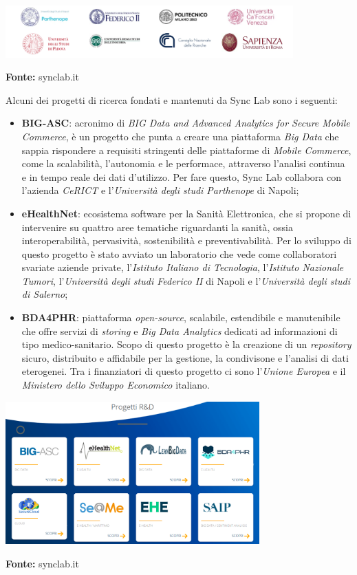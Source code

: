 \begin{minipage}{\linewidth}
  \centering
    \includegraphics[height=2cm]{immagini/universita}
  \caption*{\textbf{Fonte:} synclab.it}
\end{minipage}

Alcuni dei progetti di ricerca fondati e mantenuti da Sync Lab sono i seguenti:
\begin{itemize}
  \item \textbf{BIG-ASC}: acronimo di \textit{BIG Data and Advanced Analytics for Secure Mobile Commerce}, è un progetto che punta a creare una piattaforma \textit{Big Data} che sappia rispondere a requisiti stringenti delle piattaforme di \textit{Mobile Commerce}, come la scalabilità, l'autonomia e le performace, attraverso l'analisi continua e in tempo reale dei dati d'utilizzo. Per fare questo, Sync Lab collabora con l'azienda \textit{CeRICT} e l'\textit{Università degli studi Parthenope} di Napoli;
  \item \textbf{eHealthNet}: ecosistema software per la Sanità Elettronica, che si propone di intervenire su quattro aree tematiche riguardanti la sanità, ossia interoperabilità, pervasività, sostenibilità e preventivabilità. Per lo sviluppo di questo progetto è stato avviato un laboratorio che vede come collaboratori svariate aziende private, l'\textit{Istituto Italiano di Tecnologia}, l'\textit{Istituto Nazionale Tumori}, l'\textit{Università degli studi Federico II} di Napoli e l'\textit{Università degli studi di Salerno};
  \item \textbf{BDA4PHR}: piattaforma \textit{open-source}, scalabile, estendibile e manutenibile che offre servizi di \textit{storing} e \textit{Big Data Analytics} dedicati ad informazioni di tipo medico-sanitario. Scopo di questo progetto è la creazione di un \textit{repository} sicuro, distribuito e affidabile per la gestione, la condivisone e l'analisi di dati eterogenei. Tra i finanziatori di questo progetto ci sono l'\textit{Unione Europea} e il \textit{Ministero dello Sviluppo Economico} italiano.
\end{itemize}

\begin{minipage}{\linewidth}
  \centering
    \includegraphics[height=5.5cm]{immagini/progetti}
  \caption*{\textbf{Fonte:} synclab.it}
\end{minipage}


